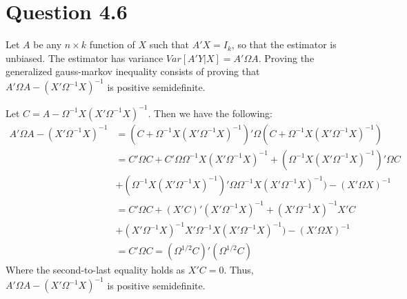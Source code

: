 \documentclass[11pt]{article} %
\begin{document}
\section{Question 4.6}
Let $A$ be any $n\times k$ function of $X$ such that $A'X = I_k$, so that the estimator is unbiased. The estimator has variance $Var[A'Y|X] = A'\Omega A$. Proving the generalized gauss-markov inequality consists of proving that $A'\Omega A - (X' \Omega^{-1} X)^{-1}$ is positive semidefinite.

Let $C = A- \Omega^{-1}X(X'\Omega^{-1}X)^{-1}. $ Then we have the following:
\begin{align*}
A'\Omega A - (X' \Omega^{-1} X)^{-1} &= (C+\Omega^{-1}X(X'\Omega^{-1}X)^{-1})'\Omega(C+\Omega^{-1}X(X'\Omega^{-1}X)^{-1})\\
&= C'\Omega C + C'\Omega \Omega^{-1} X(X'\Omega^{-1}X)^{-1} + (\Omega^{-1}X(X'\Omega^{-1}X)^{-1})'\Omega C \\
&+  (\Omega^{-1}X(X'\Omega^{-1}X)^{-1})'\Omega \Omega^{-1}X(X'\Omega^{-1}X)^{-1}) - (X'\Omega X)^{-1}\\
&= C'\Omega C + (X'C)'(X'\Omega^{-1}X)^{-1} + (X'\Omega^{-1}X)^{-1}X'C \\
&+  (X'\Omega^{-1}X)^{-1}X'\Omega^{-1}X(X'\Omega^{-1}X)^{-1}) - (X'\Omega X)^{-1}\\
&= C'\Omega C = (\Omega^{1/2}C)'(\Omega^{1/2}C)
\end{align*}
Where the second-to-last equality holds as $X'C=0$. Thus, $A'\Omega A - (X' \Omega^{-1} X)^{-1}$ is positive semidefinite.
\end{document}
